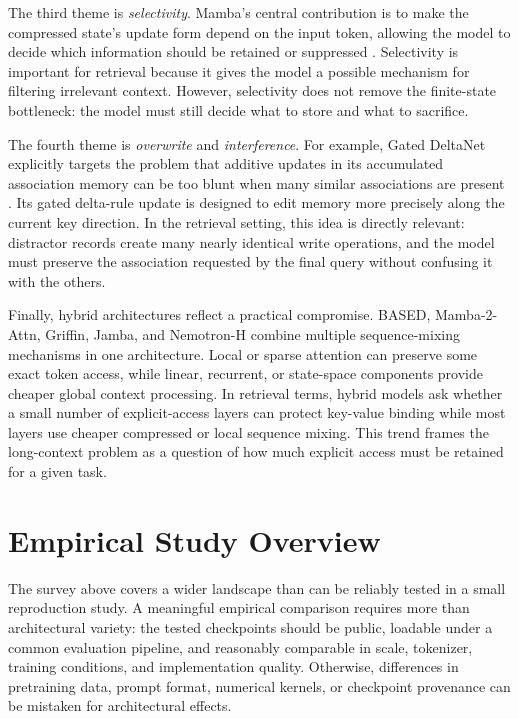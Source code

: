 \documentclass[10pt]{article}
\begin{document}
The third theme is \textit{selectivity}. Mamba's central contribution is to make the
compressed state's update form depend on the input token, allowing the model to decide which information should be retained or suppressed \cite{gu2023mamba}.
Selectivity is important for retrieval because it gives the model a possible
mechanism for filtering irrelevant context. However, selectivity does not
remove the finite-state bottleneck: the model must still decide what to store
and what to sacrifice.

The fourth theme is \textit{overwrite} and \textit{interference}. For example, Gated DeltaNet explicitly targets the problem that additive updates in its accumulated association memory can be too blunt when many similar associations are present \cite{yang2024gateddelta}. Its gated delta-rule update is designed to edit memory more precisely along the current key direction. In the retrieval setting, this idea is directly relevant: distractor records create many nearly identical write operations, and the model must preserve the association requested by the final query without confusing it with the others.

Finally, hybrid architectures reflect a practical compromise. BASED,
Mamba-2-Attn, Griffin, Jamba, and Nemotron-H combine multiple sequence-mixing mechanisms in one architecture. Local or sparse attention can preserve some exact token access, while linear, recurrent, or state-space components provide cheaper global context processing. In retrieval terms, hybrid models ask
whether a small number of explicit-access layers can protect key-value binding
while most layers use cheaper compressed or local sequence mixing. This trend
frames the long-context problem as a question of how much explicit access must
be retained for a given task.

\section{Empirical Study Overview}

The survey above covers a wider landscape than can be reliably tested in a small
reproduction study. A meaningful empirical comparison requires more than
architectural variety: the tested checkpoints should be public, loadable under
a common evaluation pipeline, and reasonably comparable in scale, tokenizer,
training conditions, and implementation quality. Otherwise, differences in
pretraining data, prompt format, numerical kernels, or checkpoint provenance
can be mistaken for architectural effects.
\end{document}
